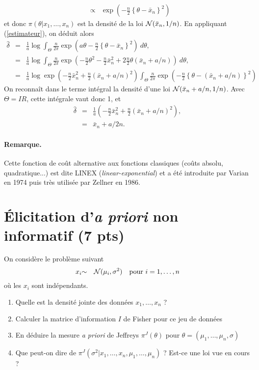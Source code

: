 \documentclass[10pt]{article}
\newcommand{\R}{I\!\!R}
\newcommand{\E}{\mbox{E}}
\newcommand{\1}{\mathbbm{1}}
\begin{document}
\begin{enumerate}
\begin{eqnarray*}
 & \propto &  \exp\left(- \frac{n}{2}\left\{\theta - \bar{x}_n\right\}^2\right)
\end{eqnarray*}
et donc $\pi(\theta|x_1,\ldots,x_n)$ est la densité de la loi ${\cal{N}}(\bar{x}_n,1/n)$. En appliquant (\ref{estimateur}), on déduit alors 
\begin{eqnarray*}
\hat{\delta} & = & \frac{1}{a}\log  \int_{\Theta} \frac{n}{2\pi} \exp\left(a\theta -  \frac{n}{2}\left\{\theta - \bar{x}_n\right\}^2\right) \ d\theta, \\
 & = & \frac{1}{a}\log  \int_{\Theta} \frac{n}{2\pi} \exp\left(-\frac{n}{2}\theta^2 -  \frac{n}{2}\bar{x}^2_n + 2 \frac{n}{2}\theta (\bar{x}_n + a/n) \right) \ d\theta, \\
 & = & \frac{1}{a}\log  \exp\left (-  \frac{n}{2}\bar{x}^2_n + \frac{n}{2}(\bar{x}_n + a/n)^2\right)\int_{\Theta} \frac{n}{2\pi}  \exp\left(-\frac{n}{2} \left\{\theta - (\bar{x}_n + a/n)\right\}^2\right) 
\end{eqnarray*}
On reconnaît dans le terme intégral la densité d'une loi ${\cal{N}}(\bar{x}_n + a/n,1/n)$. Avec $\Theta=\R$, cette intégrale vaut donc 1, et 
\begin{eqnarray*}
\hat{\delta} & = & \frac{1}{a} \left (-  \frac{n}{2}\bar{x}^2_n + \frac{n}{2}(\bar{x}_n + a/n)^2\right), \\
& = & \bar{x}_n + a/2n.  
\end{eqnarray*}

\end{enumerate}

\paragraph{Remarque.} Cette fonction de coût alternative aux fonctions classiques (coûts absolu, quadratique...) est dite LINEX ({\it linear-exponential}) et a été introduite par Varian en 1974 puis très utilisée par Zellner en 1986.  

\section{\'Elicitation d'{\it a priori} non informatif (7 pts)}

On considère le problème suivant
\begin{eqnarray*}
x_i & {\sim} & {\cal{N}}(\mu_i,\sigma^2) \ \ \ \text{pour $i=1,\ldots,n$}
\end{eqnarray*}
où les $x_i$ sont indépendants. 

\begin{enumerate}
\item Quelle est la densité jointe des données $x_1,\ldots,x_n$ ?
\item Calculer la matrice d'information $I$ de Fisher pour ce jeu de données
\item En déduire la mesure {\it a priori} de Jeffreys $\pi^J(\theta)$ pour $\theta=(\mu_1,\ldots,\mu_n,\sigma)$
\item Que peut-on dire de $\pi^J(\sigma^2|x_1,\ldots,x_n,\mu_1,\ldots,\mu_n)$ ? Est-ce une loi vue en cours ? 
\end{enumerate}
\end{document}
